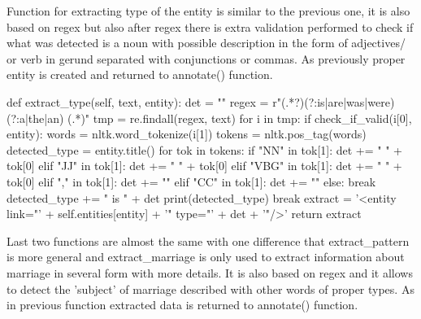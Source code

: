 \documentclass[a4paper]{article}
\begin{document}
Function for extracting type of the entity is similar to the previous one, it is also based on regex but also after regex there is extra validation performed to check if what was detected is a noun with possible description in the form of adjectives/ or verb in gerund separated with conjunctions or commas. As previously proper entity is created and returned to annotate() function.
\begin{python}
    def extract_type(self, text, entity):
        det = ""
        regex = r"(.*?)(?:is|are|was|were) (?:a|the|an) (.*)"
        tmp = re.findall(regex, text)
        for i in tmp:
            if check_if_valid(i[0], entity):
                words = nltk.word_tokenize(i[1])
                tokens = nltk.pos_tag(words)
                detected_type = entity.title()
                for tok in tokens:
                    if "NN" in tok[1]:
                        det += " " + tok[0]
                    elif "JJ" in tok[1]:
                        det += " " + tok[0]
                    elif "VBG" in tok[1]:
                        det += " " + tok[0]
                    elif "," in tok[1]:
                        det += ""
                    elif "CC" in tok[1]:
                         det += ""
                    else:
                        break
                detected_type += " is " + det
                print(detected_type)
            break
        extract = '<entity link="' + self.entities[entity] + '" type="' + det + '"/>'
        return extract

\end{python}

Last two functions are almost the same with one difference that extract\_pattern is more general and extract\_marriage is only used to extract information about marriage in several form with more details. It is also based on regex and it allows to detect the 'subject' of marriage described with other words of proper types. As in previous function extracted data is returned to annotate() function.
\end{document}
